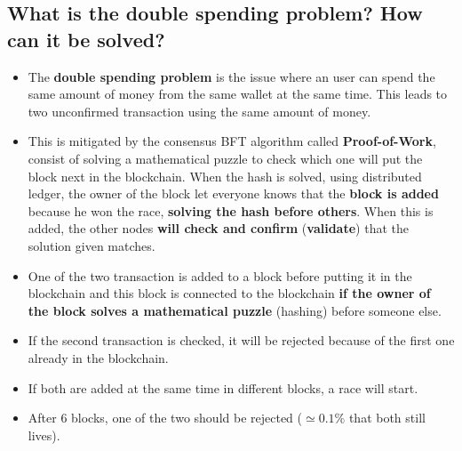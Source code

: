 \documentclass[9pt, letterpaper]{article}
\begin{document}
\subsection{What is the double spending problem? How can it be solved?}
\begin{itemize}
	\item The \textbf{double spending problem} is the issue where an user can spend the same amount of money from the same wallet at the same time. This leads to two unconfirmed transaction using the same amount of money.
	\item This is mitigated by the consensus BFT algorithm called \textbf{Proof-of-Work}, consist of solving a mathematical puzzle to check which one will put the block next in the blockchain. When the hash is solved, using distributed ledger, the owner of the block let everyone knows that the \textbf{block is added} because he won the race, \textbf{solving the hash before others}. When this is added, the other nodes \textbf{will check and confirm} (\textbf{validate}) that the solution given matches.
	\item One of the two transaction is added to a block before putting it in the blockchain and this block is connected to the blockchain \textbf{if the owner of the block solves a mathematical puzzle} (hashing) before someone else.
	\item If the second transaction is checked, it will be rejected because of the first one already in the blockchain.
	\item If both are added at the same time in different blocks, a race will start.
	\item After 6 blocks, one of the two should be rejected ($\simeq 0.1\%$ that both still lives).
\end{itemize}
\end{document}

